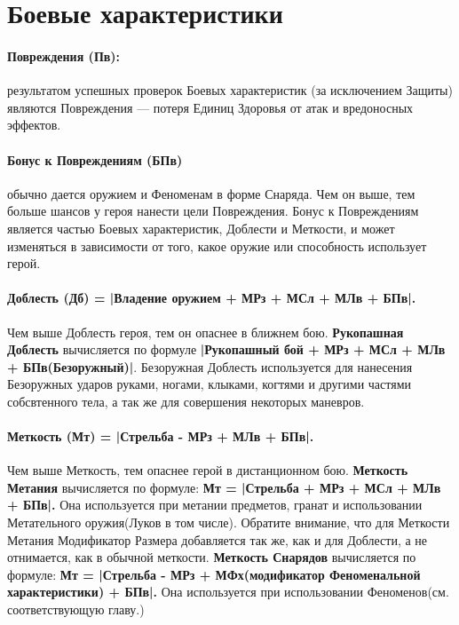 \section{Боевые характеристики}
\paragraph{Повреждения (Пв):} результатом успешных проверок Боевых характеристик (за исключением Защиты) являются Повреждения — потеря Единиц Здоровья от атак и вредоносных эффектов.
\paragraph{Бонус к Повреждениям (БПв)} обычно дается оружием и Феноменам в форме Снаряда. Чем он выше, тем больше шансов у героя нанести цели Повреждения. Бонус к Повреждениям является частью Боевых характеристик, Доблести и Меткости, и может изменяться в зависимости от того, какое оружие или способность использует герой.
\paragraph{Доблесть (Дб) = |Владение оружием + МРз + МСл + МЛв + БПв|.} Чем выше Доблесть героя, тем он опаснее в ближнем бою.
\newline \textbf{Рукопашная Доблесть} вычисляется по формуле \textbf{|Рукопашный бой + МРз + МСл + МЛв + БПв(Безоружный)|}. Безоружная Доблесть используется для нанесения Безоружных ударов руками, ногами, клыками, когтями и другими частями собсвтенного тела, а так же для совершения некоторых маневров.
\paragraph{Меткость (Мт) = |Стрельба - МРз + МЛв + БПв|.} Чем выше Меткость, тем опаснее герой в дистанционном бою.
\newline \textbf{Меткость Метания} вычисляется по формуле: \textbf{Мт = |Стрельба + МРз + МСл + МЛв + БПв|.} Она используется при метании предметов, гранат и использовании Метательного оружия(Луков в том числе). Обратите внимание, что для Меткости Метания Модификатор Размера добавляется так же, как и для Доблести, а не отнимается, как в обычной меткости.
\newline \textbf{Меткость Снарядов} вычисляется по формуле: \textbf{Мт = |Стрельба - МРз + МФх(модификатор Феноменальной характеристики) + БПв|.} Она используется при использовании Феноменов(см. соответствующую главу.)
